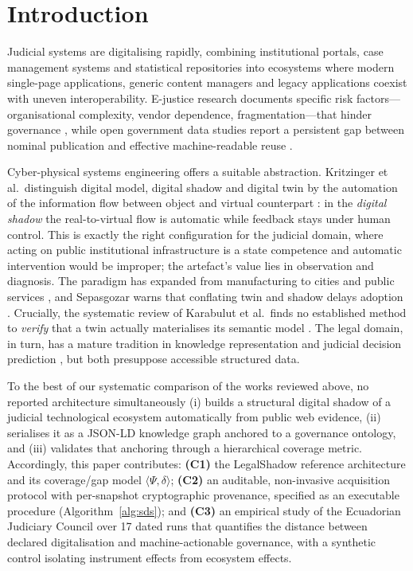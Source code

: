 \documentclass[engproc,proceedingpaper,submit,moreauthors]{Definitions/mdpi}
\begin{document}
\section{Introduction}
\label{sec:intro}

Judicial systems are digitalising rapidly, combining institutional portals, case management systems and statistical repositories into ecosystems where modern single-page applications, generic content managers and legacy applications coexist with uneven interoperability. E-justice research documents specific risk factors---organisational complexity, vendor dependence, fragmentation---that hinder governance \cite{Rosa2013}, while open government data studies report a persistent gap between nominal publication and effective machine-readable reuse \cite{Janssen2012,Attard2015}.

Cyber-physical systems engineering offers a suitable abstraction. Kritzinger et al.\ distinguish digital model, digital shadow and digital twin by the automation of the information flow between object and virtual counterpart \cite{Kritzinger2018}: in the \emph{digital shadow} the real-to-virtual flow is automatic while feedback stays under human control. This is exactly the right configuration for the judicial domain, where acting on public institutional infrastructure is a state competence and automatic intervention would be improper; the artefact's value lies in observation and diagnosis. The paradigm has expanded from manufacturing \cite{Tao2019} to cities and public services \cite{Shahat2021,Brauner2022}, and Sepasgozar warns that conflating twin and shadow delays adoption \cite{Sepasgozar2021}. Crucially, the systematic review of Karabulut et al.\ finds no established method to \emph{verify} that a twin actually materialises its semantic model \cite{Karabulut2024}. The legal domain, in turn, has a mature tradition in knowledge representation \cite{Casanovas2016} and judicial decision prediction \cite{Medvedeva2020}, but both presuppose accessible structured data.

To the best of our systematic comparison of the works reviewed above, no reported architecture simultaneously (i) builds a structural digital shadow of a judicial technological ecosystem automatically from public web evidence, (ii) serialises it as a JSON-LD knowledge graph anchored to a governance ontology, and (iii) validates that anchoring through a hierarchical coverage metric. Accordingly, this paper contributes: \textbf{(C1)} the LegalShadow reference architecture and its coverage/gap model $\langle\Psi,\delta\rangle$; \textbf{(C2)} an auditable, non-invasive acquisition protocol with per-snapshot cryptographic provenance, specified as an executable procedure (Algorithm~\ref{alg:sds}); and \textbf{(C3)} an empirical study of the Ecuadorian Judiciary Council over 17 dated runs that quantifies the distance between declared digitalisation and machine-actionable governance, with a synthetic control isolating instrument effects from ecosystem effects.
\end{document}
